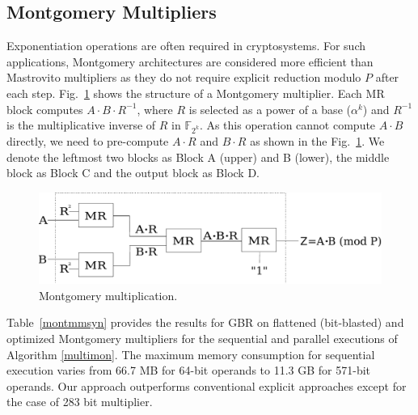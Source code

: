 \subsection{Montgomery Multipliers}{}
Exponentiation operations are often required in cryptosystems.  
For such applications, Montgomery architectures \cite{acar:1998} \cite{wu:2002}{}
\cite{Knezevic:2008} are considered more efficient than Mastrovito multipliers
as they do not require explicit reduction modulo $P$ after each step.
Fig.~\ref{montfig} shows the structure of a Montgomery
multiplier. Each MR block computes $A\cdot B\cdot R^{-1}$, where $R$
is selected as a power of a base ($\alpha^{k}$) and $R^{-1}$ is the multiplicative 
inverse of $R$ in $\mathbb{F}_{2^k}$. As this operation cannot compute $A\cdot B$
directly, we need to pre-compute $A\cdot R$ and $B\cdot R$ as shown in the Fig.~\ref{montfig}. 
We denote the leftmost
two blocks as Block A (upper) and B (lower), the middle block as Block
C and the output block as Block D.

\begin{figure}[ht]
  \centering
  \includegraphics[scale=0.34]{figures/new_mmcircuit.pdf}
  \caption{Montgomery multiplication.}
  \label{montfig}
  \end{figure}



\par Table~\ref{montmmsyn} provides the results for GBR on flattened
(bit-blasted) and  optimized Montgomery multipliers for the sequential
and parallel executions of Algorithm
\ref{multimon}. The maximum  
memory consumption for sequential execution varies from 
66.7 MB for 64-bit operands to 11.3 GB for 571-bit operands.
Our approach outperforms conventional explicit approaches except for
the case of 283 bit multiplier. 

